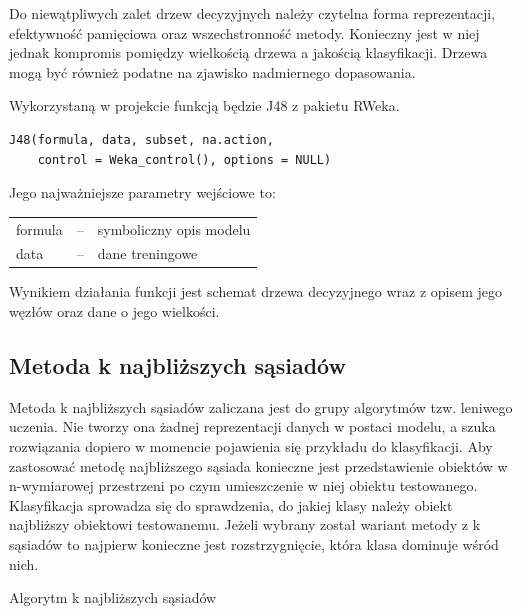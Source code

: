 \documentclass[11pt,a4paper,twoside]{article}
\begin{document}
Do niewątpliwych zalet drzew decyzyjnych należy czytelna forma reprezentacji, efektywność pamięciowa oraz wszechstronność metody. Konieczny jest w niej jednak kompromis pomiędzy wielkością drzewa a jakością klasyfikacji. Drzewa mogą być również podatne na zjawisko nadmiernego dopasowania.

Wykorzystaną w projekcie funkcją będzie J48 z pakietu RWeka.

\begin{verbatim}
J48(formula, data, subset, na.action,
    control = Weka_control(), options = NULL)
\end{verbatim} 

Jego najważniejsze parametry wejściowe to:

\begin{table}[ht]
\label{j48_params}
\centering
\begin{tabularx}{\textwidth}{lcX}
formula & -- & symboliczny opis modelu \\
data & -- & dane treningowe \\
\end{tabularx}
\end{table}

Wynikiem działania funkcji jest schemat drzewa decyzyjnego wraz z opisem jego węzłów oraz dane o jego wielkości.

\subsection{Metoda k najbliższych sąsiadów}

Metoda k najbliższych sąsiadów zaliczana jest do grupy algorytmów tzw. leniwego uczenia. Nie tworzy ona żadnej reprezentacji danych w postaci modelu, a szuka rozwiązania dopiero w momencie pojawienia się przykładu do klasyfikacji. Aby zastosować metodę najbliższego sąsiada konieczne jest przedstawienie obiektów w n-wymiarowej przestrzeni po czym umieszczenie w niej obiektu testowanego. Klasyfikacja sprowadza się do sprawdzenia, do jakiej klasy należy obiekt najbliższy obiektowi testowanemu. Jeżeli wybrany został wariant metody z k sąsiadów to najpierw konieczne jest rozstrzygnięcie, która klasa dominuje wśród nich.

\begin{algorithm}[ht]
\caption{Algorytm k najbliższych sąsiadów}
\label{kNN}
	\begin{algorithmic}
	\end{algorithmic}
\end{algorithm}
\end{document}
